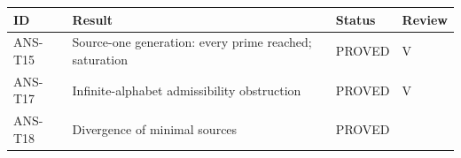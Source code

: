 \documentclass[
  11pt,
]{article}
\begin{document}
\begin{longtable}[]{@{}llll@{}}
\toprule
\begin{minipage}[b]{0.16\columnwidth}\raggedright
ID\strut
\end{minipage} & \begin{minipage}[b]{0.41\columnwidth}\raggedright
Result\strut
\end{minipage} & \begin{minipage}[b]{0.22\columnwidth}\raggedright
Status\strut
\end{minipage} & \begin{minipage}[b]{0.10\columnwidth}\raggedright
Review\strut
\end{minipage}\tabularnewline
\midrule
\endhead
\begin{minipage}[t]{0.16\columnwidth}\raggedright
ANS-T15\strut
\end{minipage} & \begin{minipage}[t]{0.41\columnwidth}\raggedright
Source-one generation: every prime reached; saturation\strut
\end{minipage} & \begin{minipage}[t]{0.22\columnwidth}\raggedright
PROVED\strut
\end{minipage} & \begin{minipage}[t]{0.10\columnwidth}\raggedright
V\strut
\end{minipage}\tabularnewline
\begin{minipage}[t]{0.16\columnwidth}\raggedright
ANS-T17\strut
\end{minipage} & \begin{minipage}[t]{0.41\columnwidth}\raggedright
Infinite-alphabet admissibility obstruction\strut
\end{minipage} & \begin{minipage}[t]{0.22\columnwidth}\raggedright
PROVED\strut
\end{minipage} & \begin{minipage}[t]{0.10\columnwidth}\raggedright
V\strut
\end{minipage}\tabularnewline
\begin{minipage}[t]{0.16\columnwidth}\raggedright
ANS-T18\strut
\end{minipage} & \begin{minipage}[t]{0.41\columnwidth}\raggedright
Divergence of minimal sources\strut
\end{minipage} & \begin{minipage}[t]{0.22\columnwidth}\raggedright
PROVED\strut
\end{minipage} & \begin{minipage}[t]{0.10\columnwidth}\raggedright

\end{minipage}
\end{longtable}
\end{document}
